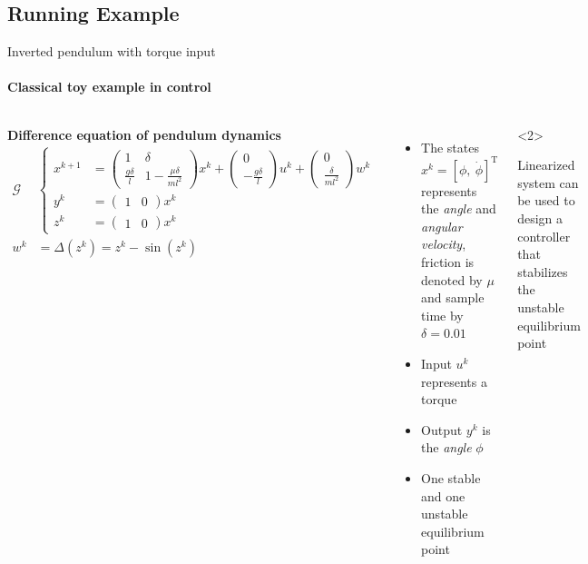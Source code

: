 \documentclass[8pt, t,
aspectratio=169,%
]{beamer}
\begin{document}
\subsection{Running Example}
\begin{frame}{Inverted pendulum with torque input}
    \framesubtitle{Classical toy example in control}
    \begin{columns}[]
        \textbf{Difference equation of pendulum dynamics}
        \begin{align}
            \mathcal{G} &\left\{ \begin{aligned} 
                x^{k+1} & = 
                \begin{pmatrix}
                    1 & \delta \\
                    \frac{g \delta}{l} & 1 - \frac{\mu \delta}{m l^2}
                \end{pmatrix}
                x^k + 
                \begin{pmatrix}
                    0 \\
                    -\frac{g\delta}{l}
                \end{pmatrix}
                u^k +
                \begin{pmatrix}
                    0 \\
                    \frac{\delta}{ml^2}
                \end{pmatrix}
                w^k \\
                y^k & = 
                \begin{pmatrix}
                    1 & 0
                \end{pmatrix} x^k \\
                z^k & = 
                \begin{pmatrix}
                    1 & 0
                \end{pmatrix}
                x^k
            \end{aligned} \right.\label{eq:linear_inv_pend}\\
            w^k &  = \Delta(z^k) = z^k - \sin(z^k) \label{eq:nonlinear_inv_pend}
        \end{align}
        \begin{itemize}
            \item The states $x^k = [\phi, ~ \dot{\phi}]^{\mathrm{T}}$ represents the \emph{angle} and \emph{angular velocity}, friction is denoted by $\mu$ and sample time by $\delta = 0.01$
            \item Input $u^k$ represents a torque
            \item Output $y^k$ is the \emph{angle} $\phi$
            \item One stable and one unstable equilibrium point         
        \end{itemize}
        \begin{onlyenv}<2>
            \begin{block}{}
                Linearized system can be used to design a controller that stabilizes the unstable equilibrium point
            \end{block}
        \end{onlyenv}


\end{columns}
\end{frame}
\end{document}
